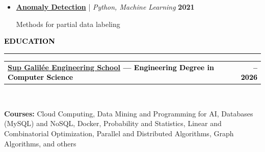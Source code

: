 \documentclass[10pt,english,french]{article}
\makeatletter
\newcommand{\educationIcon}[1][black]{\textcolor{#1}{\faGraduationCap}}
\newlength{\mpwidth}
\newcommand{\cvsection}[1]{
    \vspace{4pt}
    \textbf{\fontsize{9pt}{10pt}\selectfont \textcolor{black}{#1}}
    \vspace{6pt}
    \hrule
    \vspace{6pt}
}
\newcommand{\cvtextnotab}[1]{
    \parbox{1\mpwidth}{#1}
}
\newcommand{\cvevent}[2]{
    \vspace{2pt}
    \parbox{\mpwidth}{
        \begin{tabular*}{1\mpwidth}{@{\extracolsep{\fill}} l r}
            \textcolor{black}{\textbf{\fontsize{11}{12}\selectfont #1}} & \textcolor{black}{\textbf{\fontsize{12}{12}\selectfont #2}} \\
        \end{tabular*}\\[-8pt] %
    }
}
\newcommand{\cvsubevent}[2]{
    \parbox{\mpwidth}{
        \begin{tabular*}{1\mpwidth}{@{\extracolsep{\fill}} l r}
            \textcolor{black}{\textit{\fontsize{10}{12}\selectfont #1}} & \textcolor{black}{\textit{\fontsize{10}{12}\selectfont #2}} \\
        \end{tabular*}\\[-8pt] %
    }
    \vspace{-10pt}
}
\makeatother
\begin{document}
\begin{itemize}[leftmargin=0.5cm, label=\textbullet, itemsep=0.2em]
    \item \href{https://github.com/DmytroPalahin/Anomaly_Detection}{\textbf{Anomaly Detection}} | \textit{Python, Machine Learning} \hfill \textbf{2021}

          Methods for partial data labeling


\end{itemize}

\vspace{-5pt}
\cvsection{\educationIcon[black]\hspace{4pt}EDUCATION}

\vspace{-3pt}
\cvevent{\href{https://www.sup-galilee.univ-paris13.fr/}{Sup Galilée Engineering School} --- Engineering Degree in Computer Science}{\fontsize{11pt}{11pt}\selectfont 2023\hspace{5pt}--\hspace{5pt}2026}

\vspace{-3pt}
\cvtextnotab{\textbf{Courses\!:} Cloud Computing, Data Mining and Programming for AI, Databases (MySQL) and NoSQL, Docker, Probability and Statistics, Linear and Combinatorial Optimization, Parallel and Distributed Algorithms, Graph Algorithms, and others}

\vspace{-10pt}
\noindent{\textcolor{middle_light_gray}{\rule{\mpwidth}{0.2pt}}}
\vspace{-15pt}
\end{document}
